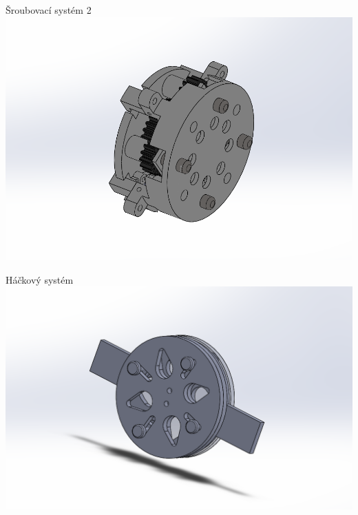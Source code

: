\documentclass{beamer}
\begin{document}
\begin{frame}{Šroubovací systém 2}
    \centering
    \includegraphics[width=\textwidth]{img/screw2}
\end{frame}

\begin{frame}{Háčkový systém}
    \centering
    \includegraphics[width=\textwidth]{img/clip1}
\end{frame}
\end{document}
